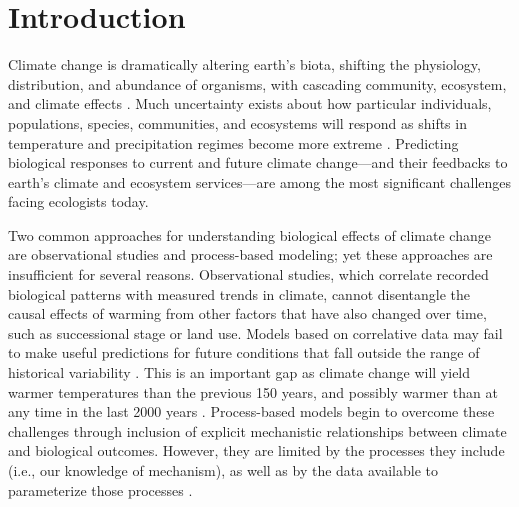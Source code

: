 \documentclass{article}
\begin{document}
 
\section* {Introduction}
\par Climate change is dramatically altering earth's biota, shifting the physiology, distribution, and abundance of organisms, with cascading community, ecosystem, and climate effects \citep{shukla1982,cox2000,thomas2004,parmesan2006,field2007,sheldon2011,urban2012}. Much uncertainty exists about how particular individuals, populations, species, communities, and ecosystems will respond as shifts in temperature and precipitation regimes become more extreme \citep{thuiller2004,friedlingstein2014}.
Predicting biological responses to current and future climate change---and their feedbacks to earth's climate and ecosystem services---are among the most significant challenges facing ecologists today.
\par Two common approaches for understanding biological effects of climate change are observational studies and process-based modeling; yet these approaches are insufficient for several reasons. Observational studies, which correlate recorded biological patterns with measured trends in climate, cannot disentangle the causal effects of warming from other factors that have also changed over time, such as successional stage or land use. Models based on correlative data may fail to make useful predictions for future conditions that fall outside the range of historical variability \citep [e.g.,][]{pearson2004,hampe2004,ibanez2006,swab2012,chuine2016}. This is an important gap as climate change will yield warmer temperatures than the previous 150 years, and possibly warmer than at any time in the last 2000 years \citep{ohlemuller2006,williams2007,williams2007b,ipcc2013}. Process-based models begin to overcome these challenges through inclusion of explicit mechanistic relationships between climate and biological outcomes. However, they are limited by the processes they include (i.e., our knowledge of mechanism), as well as by the data available to parameterize those processes \citep{moorcroft2006,kearney2009}. 
\end{document}
